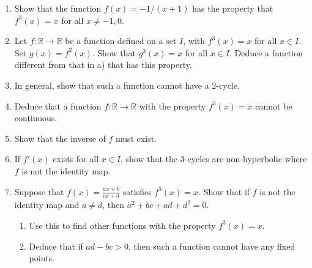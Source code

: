 \begin{problem}{7}
  \begin{enumerate}
    \item Show that the function $f(x) = -1/(x+1)$ has the property that $f^3(x) = x$
      for all $x\neq-1,0$.
    \item Let $f:\mathbb{R} \to \mathbb{R}$ be a function
      defined on a set $I$, with $f^3(x) = x$ for all $x\in I$. Set $g(x) = f^2(x)$.
      Show that $g^3(x) = x$ for all $x\in I$. Deduce a function different from that
      in a) that has this property.
    \item In general, show that such a function cannot have a 2-cycle.
    \item Deduce that a function $f:\mathbb{R}\to\mathbb{R}$ with the property $f^3(x) = x$
      cannot be continuous.
    \item Show that the inverse of $f$ must exist.
    \item If $f'(x)$ exists for all $x\in I$, show that the 3-cycles are non-hyperbolic where $f$ is not the identity map.
    \item Suppose that $\displaystyle f(x) = \frac{ax + b}{cx + d}$ satisfies $f^3(x) = x$. Show that if $f$ is not the identity map
      and $a\neq d$, then $a^2 +bc + ad +d^2 = 0$.
      \begin{enumerate}[label=\roman*)]
        \item Use this to find other functions with the property $f^3(x) = x$.
        \item Deduce that if $ad- bc > 0$, then such a function cannot have any fixed points.
      \end{enumerate}
  \end{enumerate}
\end{problem}

